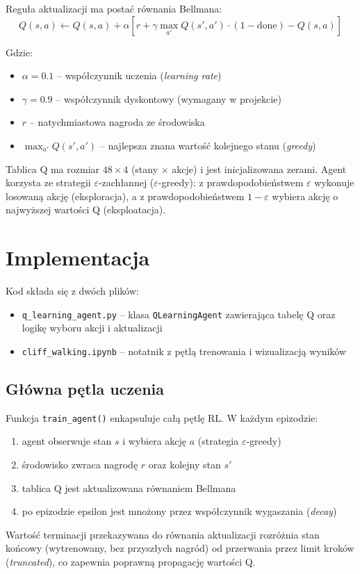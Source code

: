 \documentclass[12pt,a4paper]{article}
\begin{document}
Reguła aktualizacji ma postać równania Bellmana:
\begin{equation*}
    Q(s, a) \leftarrow Q(s, a) + \alpha \left[ r + \gamma \max_{a'} Q(s', a') \cdot (1 - \text{done}) - Q(s, a) \right]
\end{equation*}

Gdzie:
\begin{itemize}
    \item $\alpha = 0.1$ – współczynnik uczenia (\textit{learning rate})
    \item $\gamma = 0.9$ – współczynnik dyskontowy (wymagany w projekcie)
    \item $r$ – natychmiastowa nagroda ze środowiska
    \item $\max_{a'} Q(s', a')$ – najlepsza znana wartość kolejnego stanu (\textit{greedy})
\end{itemize}

Tablica Q ma rozmiar $48 \times 4$ (stany $\times$ akcje) i jest inicjalizowana zerami. Agent korzysta ze strategii $\varepsilon$-zachłannej ($\varepsilon$-greedy): z prawdopodobieństwem $\varepsilon$ wykonuje losowaną akcję (eksploracja), a z prawdopodobieństwem $1-\varepsilon$ wybiera akcję o najwyższej wartości Q (eksploatacja).

\section{Implementacja}
Kod składa się z dwóch plików:
\begin{itemize}
    \item \texttt{q\_learning\_agent.py} – klasa \texttt{QLearningAgent} zawierająca tabelę Q oraz logikę wyboru akcji i aktualizacji
    \item \texttt{cliff\_walking.ipynb} – notatnik z pętlą trenowania i wizualizacją wyników
\end{itemize}

\subsection*{Główna pętla uczenia}
Funkcja \texttt{train\_agent()} enkapsuluje całą pętlę RL. W każdym epizodzie:
\begin{enumerate}
    \item agent obserwuje stan $s$ i wybiera akcję $a$ (strategia $\varepsilon$-greedy)
    \item środowisko zwraca nagrodę $r$ oraz kolejny stan $s'$
    \item tablica Q jest aktualizowana równaniem Bellmana
    \item po epizodzie epsilon jest mnożony przez współczynnik wygaszania (\textit{decay})
\end{enumerate}
Wartość terminacji przekazywana do równania aktualizacji rozróżnia stan końcowy (wytrenowany, bez przyszłych nagród) od przerwania przez limit kroków (\textit{truncated}), co zapewnia poprawną propagację wartości Q.
\end{document}
